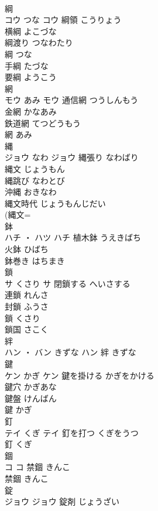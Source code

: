 \documentclass[8pt]{extreport}
\begin{document}
\begin{CJK}{UTF8}{min}
\\	綱	
\\	コウ	つな	コウ	綱領	こうりょう	
\\	横綱	よこづな	
\\	綱渡り	つなわたり	
\\	綱	つな	
\\	手綱	たづな	
\\	要綱	ようこう	
\\	網	
\\	モウ	あみ	モウ	通信網	つうしんもう	
\\	金網	かなあみ	
\\	鉄道網	てつどうもう	
\\	網	あみ	
\\	縄	
\\	ジョウ	なわ	ジョウ	縄張り	なわばり	
\\	縄文	じょうもん	
\\	縄跳び	なわとび	
\\	沖縄	おきなわ	
\\	縄文時代	じょうもんじだい	
\\	(縄文=
\\	鉢	
\\	ハチ ・ ハツ		ハチ	植木鉢	うえきばち	
\\	火鉢	ひばち	
\\	鉢巻き	はちまき	
\\	鎖	
\\	サ	くさり	サ	閉鎖する	へいさする	
\\	連鎖	れんさ	
\\	封鎖	ふうさ	
\\	鎖	くさり	
\\	鎖国	さこく	
\\	絆	
\\	ハン ・ バン	きずな	ハン													絆	きずな	
\\	鍵	
\\	ケン	かぎ	ケン	鍵を掛ける	かぎをかける	
\\	鍵穴	かぎあな	
\\	鍵盤	けんばん	
\\	鍵	かぎ	
\\	釘	
\\	テイ	くぎ	テイ	釘を打つ	くぎをうつ	
\\	釘	くぎ	
\\	錮	
\\	コ		コ	禁錮	きんこ	
\\	禁錮	きんこ	
\\	錠	
\\	ジョウ		ジョウ	錠剤	じょうざい	

\end{CJK}
\end{document}
